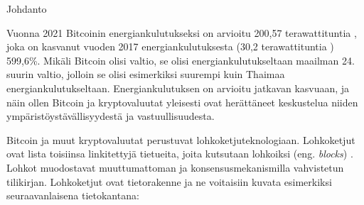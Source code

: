 \begin{chapter}{Johdanto\label{intro}}
\begin{otherlanguage}{finnish}

Vuonna 2021 Bitcoinin energiankulutukseksi on arvioitu 200,57 terawattituntia \cite{bitcoinenergy}, joka on kasvanut vuoden 2017 energiankulutuksesta (30,2 terawattituntia \cite{bitcoinenergy1}) 599,6\%. Mikäli Bitcoin olisi valtio, se olisi energiankulutukseltaan maailman 24. suurin valtio, jolloin se olisi esimerkiksi suurempi kuin Thaimaa energiankulutukseltaan. Energiankulutuksen on arvioitu jatkavan kasvuaan, ja näin ollen Bitcoin ja kryptovaluutat yleisesti ovat herättäneet keskustelua niiden ympäristöystävällisyydestä ja vastuullisuudesta.

Bitcoin ja muut kryptovaluutat perustuvat lohkoketjuteknologiaan. Lohkoketjut ovat lista toisiinsa linkitettyjä tietueita, joita kutsutaan lohkoiksi (eng. \textit{blocks}) \cite{blockchain1}. Lohkot muodostavat muuttumattoman ja konsensusmekanismilla vahvistetun tilikirjan. Lohkoketjut ovat tietorakenne ja ne voitaisiin kuvata esimerkiksi seuraavanlaisena tietokantana:


\end{otherlanguage}
\end{chapter}
